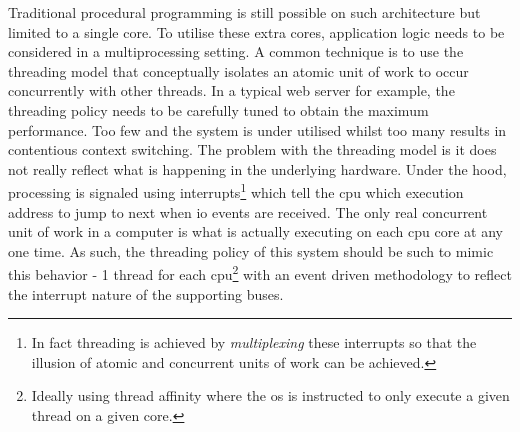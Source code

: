 \documentclass[a4paper,11pt]{scrreprt}
\begin{document}
Traditional procedural programming is still possible on such architecture but limited to a single core. To utilise these extra cores, application logic needs to be considered in a multiprocessing setting. A common technique is to use the threading model that conceptually isolates an atomic unit of work to occur concurrently with other threads. In a typical web server for example, the threading policy needs to be carefully tuned to obtain the maximum performance. Too few and the system is under utilised whilst too many results in contentious context switching. The problem with the threading model is it does not really reflect what is happening in the underlying hardware. Under the hood, processing is signaled using interrupts\footnote{In fact threading is achieved by \textit{multiplexing} these interrupts so that the illusion of atomic and concurrent units of work can be achieved.} which tell the \acrshort{cpu} which execution address to jump to next when \acrshort{io} events are received. The only real concurrent unit of work in a computer is what is actually executing on each \acrshort{cpu} core at any one time. As such, the threading policy of this system should be such to mimic this behavior - 1 thread for each \acrshort{cpu}\footnote{Ideally using thread affinity where the \acrshort{os} is instructed to only execute a given thread on a given core.} with an event driven methodology to reflect the interrupt nature of the supporting buses.
\end{document}
